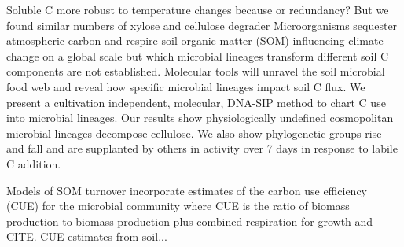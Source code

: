 Soluble C more robust to temperature changes because or redundancy? But we
found similar numbers of xylose and cellulose degrader
Microorganisms sequester atmospheric carbon and respire soil organic matter
(SOM) influencing climate change on a global scale but which microbial lineages
transform different soil C components are not established. Molecular tools will
unravel the soil microbial food web and reveal how specific microbial lineages
impact soil C flux. We present a cultivation independent, molecular, DNA-SIP
method to chart C use into microbial lineages. Our results show physiologically
undefined cosmopolitan microbial lineages decompose cellulose. We also show
phylogenetic groups rise and fall and are supplanted by others in activity over
7 days in response to labile C addition.  

Models of SOM turnover incorporate estimates of the carbon use efficiency
(CUE) for the microbial community where CUE is the ratio of biomass
production to biomass production plus combined respiration for growth and
 CITE.  CUE estimates from soil... 
